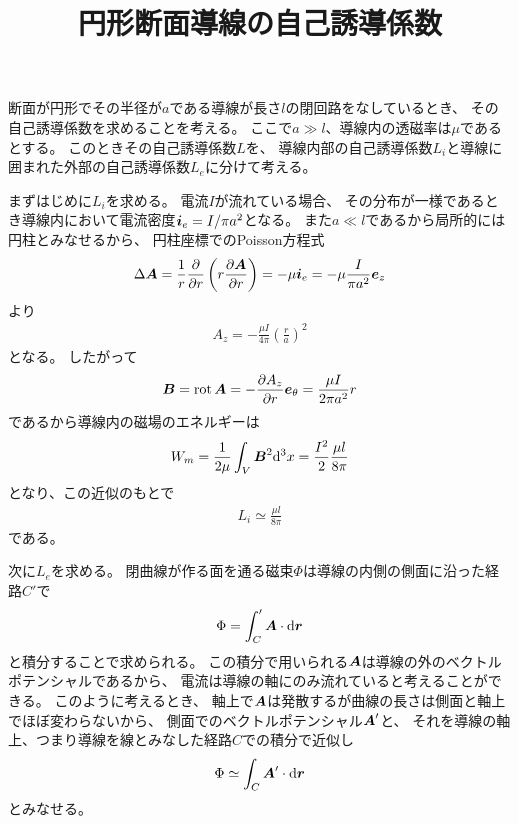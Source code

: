 \documentclass[a4paper, 12pt]{jsarticle}
\title{円形断面導線の自己誘導係数}
\theoremstyle{definition}
\def\vec#1{\mbox{\boldmath $#1$}}
\newcommand{\pdif}[2]{\frac{\partial #1}{\partial #2}}
\newcommand{\ddif}{{\rm d}}
\DeclareMathOperator{\Rot}{rot}
\begin{document}
\maketitle
\allowdisplaybreaks[4]

断面が円形でその半径が$a$である導線が長さ$l$の閉回路をなしているとき、
その自己誘導係数を求めることを考える。
ここで$a \gg l$、導線内の透磁率は$\mu$であるとする。
このときその自己誘導係数$L$を、
導線内部の自己誘導係数$L_i$と導線に囲まれた外部の自己誘導係数$L_e$に分けて考える。

まずはじめに$L_i$を求める。
電流$I$が流れている場合、
その分布が一様であるとき導線内において電流密度$\vec{i}_e = I/\pi a^2$となる。
また$a \ll l$であるから局所的には円柱とみなせるから、
円柱座標でのPoisson方程式
\begin{align}
    \Delta \vec{A}
    = \frac{1}{r} \pdif{}{r} \left( r \pdif{\vec{A}}{r} \right)
    = -\mu \vec{i}_e
    = -\mu \frac{I}{\pi a^2} \vec{e}_z
\end{align}
より
\begin{align}
    A_z = -\frac{\mu I}{4\pi} \left( \frac{r}{a} \right)^2
\end{align}
となる。
したがって
\begin{align}
    \vec{B} = \Rot \vec{A}
    = -\pdif{A_z}{r} \vec{e}_\theta
    = \frac{\mu I}{2 \pi a^2} r
\end{align}
であるから導線内の磁場のエネルギーは
\begin{align}
    W_m = \frac{1}{2 \mu} \int_V \vec{B}^2 \ddif^3 x
    = \frac{I^2}{2} \frac{\mu l}{8 \pi}
\end{align}
となり、この近似のもとで
\begin{align}
    L_i \simeq \frac{\mu l}{8\pi}
\end{align}
である。

次に$L_e$を求める。
閉曲線が作る面を通る磁束$\Phi$は導線の内側の側面に沿った経路$C'$で
\begin{align}
    \Phi = \int_C' \vec{A} \cdot \ddif \vec{r}
\end{align}
と積分することで求められる。
この積分で用いられる$\vec{A}$は導線の外のベクトルポテンシャルであるから、
電流は導線の軸にのみ流れていると考えることができる。
このように考えるとき、
軸上で$\vec{A}$は発散するが曲線の長さは側面と軸上でほぼ変わらないから、
側面でのベクトルポテンシャル$\vec{A}'$と、
それを導線の軸上、つまり導線を線とみなした経路$C$での積分で近似し
\begin{align}
    \Phi \simeq \int_C \vec{A}' \cdot \ddif \vec{r}
\end{align}
とみなせる。
\end{document}
